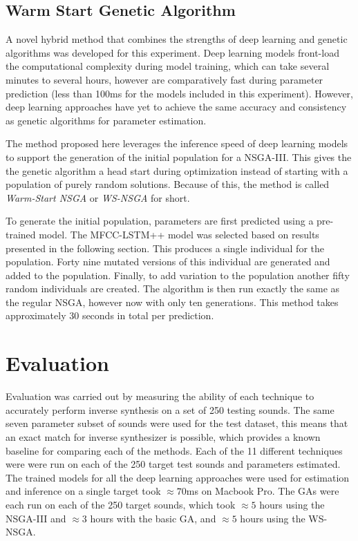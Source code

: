\subsection{Warm Start Genetic Algorithm}
A novel hybrid method that combines the strengths of deep learning and genetic algorithms was developed for this experiment. Deep learning models front-load the computational  complexity during model training, which can take several minutes to several hours, however are comparatively fast during parameter prediction (less than 100ms for the models included in this experiment). However, deep learning approaches have yet to achieve the same accuracy and consistency as genetic algorithms for parameter estimation.

The method proposed here leverages the inference speed of deep learning models to support the generation of the initial population for a NSGA-III. This gives the the genetic algorithm a head start during optimization instead of starting with a population of purely random solutions. Because of this, the method is called \textit{Warm-Start NSGA} or \textit{WS-NSGA} for short.

To generate the initial population, parameters are first predicted using a pre-trained model. The MFCC-LSTM++ model was selected based on results presented in the following section. This produces a single individual for the population. Forty nine mutated versions of this individual are generated and added to the population. Finally, to add variation to the population another fifty random individuals are created. The algorithm is then run exactly the same as the regular NSGA, however now with only ten generations. This method takes approximately 30 seconds in total per prediction.

\section{Evaluation}
\label{sec:inverse-synth-eval}

Evaluation was carried out by measuring the ability of each technique to accurately perform inverse synthesis on a set of 250 testing sounds. The same seven parameter subset of sounds were used for the test dataset, this means that an exact match for inverse synthesizer is possible, which provides a known baseline for comparing each of the methods. Each of the 11 different techniques were were run on each of the 250 target test sounds and parameters estimated. The trained models for all the deep learning approaches were used for estimation and inference on a single target took $\approx 70$ms on Macbook Pro. The GAs were each run on each of the 250 target sounds, which took $\approx 5$ hours using the NSGA-III and $\approx 3$ hours with the basic GA, and $\approx 5$ hours using the WS-NSGA. 


